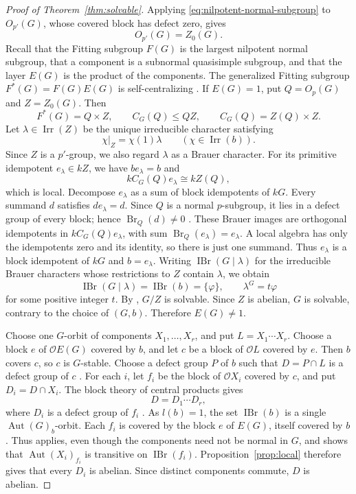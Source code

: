\documentclass[11pt,a4paper]{article}
\theoremstyle{definition}
\theoremstyle{remark}
\numberwithin{equation}{section}
\newcommand{\cO}{\mathcal{O}}
\DeclareMathOperator{\Irr}{Irr}
\DeclareMathOperator{\IBr}{IBr}
\DeclareMathOperator{\Aut}{Aut}
\DeclareMathOperator{\Br}{Br}
\begin{document}
\begin{proof}[Proof of Theorem~\ref{thm:solvable}]
		Applying \eqref{eq:nilpotent-normal-subgroup} to $O_{p'}(G)$,
		whose covered block has defect zero, gives
		\[
		O_{p'}(G)=Z_0(G).
		\]
		Recall that the Fitting subgroup $F(G)$ is the largest
		nilpotent normal subgroup, that a component is a subnormal
		quasisimple subgroup, and that the layer $E(G)$ is the
		product of the components. The generalized Fitting subgroup
		$F^*(G)=F(G)E(G)$ is self-centralizing \cite[Theorem~9.8]{Isaacs2008}.
		If $E(G)=1$, put $Q=O_p(G)$ and $Z=Z_0(G)$. Then
		\[
		F^*(G)=Q\times Z,\qquad
		C_G(Q)\leq QZ,\qquad C_G(Q)=Z(Q)\times Z.
		\]
		Let $\lambda\in\Irr(Z)$ be the unique irreducible character
		satisfying
		\[
		\chi|_Z=\chi(1)\lambda\qquad(\chi\in\Irr(b)).
		\]
		Since $Z$ is a $p'$-group, we also regard $\lambda$ as a
		Brauer character. For its primitive idempotent $e_\lambda\in kZ$,
		we have $be_\lambda=b$ and
		\[
		kC_G(Q)e_\lambda\cong kZ(Q),
		\]
		which is local.
		Decompose $e_\lambda$ as a sum of block idempotents of $kG$.
		Every summand $d$ satisfies $de_\lambda=d$. Since $Q$ is a
		normal $p$-subgroup, it lies in a defect group of every block;
		hence $\Br_Q(d)\ne0$ \cite[Theorem~9.26]{Navarro1998}. These Brauer images
		are orthogonal idempotents in $kC_G(Q)e_\lambda$, with sum
		$\Br_Q(e_\lambda)=e_\lambda$. A local algebra has only the
		idempotents zero and its identity, so there is just one summand.
		Thus $e_\lambda$ is a block idempotent of $kG$ and $b=e_\lambda$.
		Writing $\IBr(G\mid\lambda)$ for the irreducible Brauer
		characters whose restrictions to $Z$ contain $\lambda$,
		we obtain
		\[
		\IBr(G\mid\lambda)=\IBr(b)=\{\varphi\},\qquad
		\lambda^G=t\varphi
		\]
		for some positive integer $t$. By \cite[Theorem~1]{Sambale2024},
		$G/Z$ is solvable. Since $Z$ is abelian, $G$ is solvable,
		contrary to the choice of $(G,b)$. Therefore $E(G)\ne1$.
		
		Choose one $G$-orbit of components $X_1,\ldots,X_r$, and put
		$L=X_1\cdots X_r$. Choose a block $e$ of $\cO E(G)$ covered
		by $b$, and let $c$ be a block of $\cO L$ covered by $e$.
		Then $b$ covers $c$, so $c$ is $G$-stable.
		Choose a defect group $P$ of $b$ such that
		$D=P\cap L$ is a defect group of $c$
		\cite[Theorem~9.26]{Navarro1998}.
		For each $i$, let $f_i$ be the block of $\cO X_i$ covered by
		$c$, and put $D_i=D\cap X_i$. The block theory of central
		products gives
		\[
		D=D_1\cdots D_r,
		\]
		where $D_i$ is a defect group of $f_i$ \cite[Lemma~7.5(i)]{Sambale2014}.
		As $l(b)=1$, the set $\IBr(b)$ is a single
		$\Aut(G)_b$-orbit. Each $f_i$ is covered by the block $e$ of
		$E(G)$, itself covered by $b$. Thus \cite[Lemma~2.5]{JiangZhangZhou2026}
		applies, even though the components need not be normal in $G$,
		and shows that $\Aut(X_i)_{f_i}$ is transitive on $\IBr(f_i)$.
		Proposition~\ref{prop:local} therefore gives that every $D_i$
		is abelian. Since distinct components commute, $D$ is abelian.
		

\end{proof}
\end{document}
